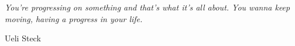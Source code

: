 \thispagestyle{empty}




\emph{
    You're progressing on something and that's what it's all about. You wanna keep moving, having a progress in your life.
}

\hfill Ueli Steck
